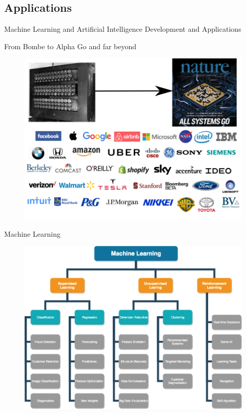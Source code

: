 \documentclass{beamer}
\begin{document}
\subsection{Applications}
\begin{frame}{Machine Learning and Artificial Intelligence}
{Development and Applications} 
{\centering From Bombe to Alpha Go and far beyond \par } 
\begin{figure}
	\includegraphics[width=.8\linewidth]{Figures/Figure_AI.png} 

\end{figure}
\end{frame}


\begin{frame}{Machine Learning}
\begin{figure}
		\includegraphics[width=.9\linewidth]{Pics/machine-learning.png}
\end{figure}
\end{frame} 
\end{document}
